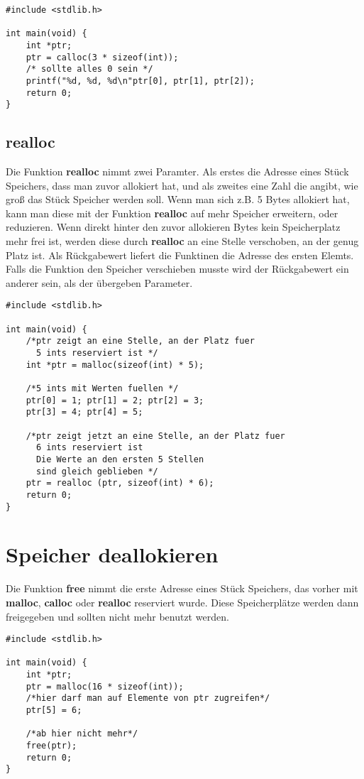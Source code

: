 \documentclass[c_worksheet.tex]{subfiles}
\begin{document}
\begin{lstlisting}
#include <stdlib.h>

int main(void) {
    int *ptr;
    ptr = calloc(3 * sizeof(int));
    /* sollte alles 0 sein */
    printf("%d, %d, %d\n"ptr[0], ptr[1], ptr[2]);
    return 0;
}
\end{lstlisting}

\subsection{realloc}

Die Funktion \textbf{realloc} nimmt zwei Paramter. Als erstes die Adresse eines Stück Speichers, dass man zuvor allokiert hat, und als zweites eine Zahl die angibt, wie groß das Stück Speicher werden soll. Wenn man sich z.B. 5 Bytes allokiert hat, kann man diese mit der Funktion \textbf{realloc} auf mehr Speicher erweitern, oder reduzieren. Wenn direkt hinter den zuvor allokieren Bytes kein Speicherplatz mehr frei ist, werden diese durch \textbf{realloc} an eine Stelle verschoben, an der genug Platz ist. Als Rückgabewert liefert die Funktinen die Adresse des ersten Elemts. Falls die Funktion den Speicher verschieben musste wird der Rückgabewert ein anderer sein, als der übergeben Parameter.

\begin{lstlisting}
#include <stdlib.h>

int main(void) {
    /*ptr zeigt an eine Stelle, an der Platz fuer 
      5 ints reserviert ist */
    int *ptr = malloc(sizeof(int) * 5);

    /*5 ints mit Werten fuellen */
    ptr[0] = 1; ptr[1] = 2; ptr[2] = 3;
    ptr[3] = 4; ptr[4] = 5;

    /*ptr zeigt jetzt an eine Stelle, an der Platz fuer
      6 ints reserviert ist
      Die Werte an den ersten 5 Stellen
      sind gleich geblieben */
    ptr = realloc (ptr, sizeof(int) * 6);
    return 0;
}
\end{lstlisting}

\section{Speicher deallokieren}

Die Funktion \textbf{free} nimmt die erste Adresse eines Stück Speichers, das vorher mit \textbf{malloc}, \textbf{calloc} oder \textbf{realloc} reserviert wurde. Diese Speicherplätze werden dann freigegeben und sollten nicht mehr benutzt werden.

\begin{lstlisting}
#include <stdlib.h>

int main(void) {
    int *ptr;
    ptr = malloc(16 * sizeof(int));
    /*hier darf man auf Elemente von ptr zugreifen*/
    ptr[5] = 6;

    /*ab hier nicht mehr*/
    free(ptr);
    return 0;
}
\end{lstlisting}
\end{document}
